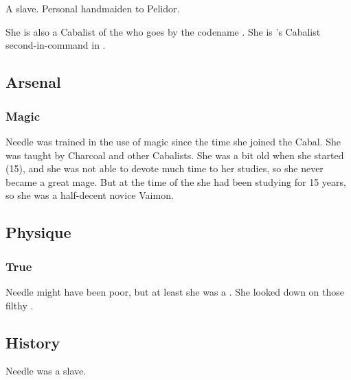 \section{\Piacet}
A slave. 
Personal handmaiden to  Pelidor. 

She is also a Cabalist of the  who goes by the codename . 
She is 's Cabalist second-in-command in \Malcur. 










\subsection{Arsenal}
\subsubsection{Magic}
Needle was trained in the use of magic since the time she joined the Cabal. 
She was taught by Charcoal and other Cabalists. 
She was a bit old when she started (15), and she was not able to devote much time to her studies, so she never became a great mage. 
But at the time of the  she had been studying for 15 years, so she was a half-decent novice Vaimon. 









\subsection{Physique}





\subsubsection{True \human}
Needle might have been poor, but at least she was a \truehuman. 
She looked down on those filthy .








\subsection{History}
Needle was a slave. 

